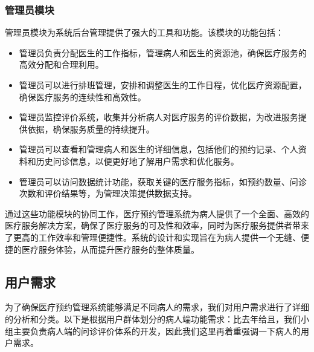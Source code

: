 \subsubsection{管理员模块}
管理员模块为系统后台管理提供了强大的工具和功能。该模块的功能包括：
\begin{itemize}
	\item 管理员负责分配医生的工作指标，管理病人和医生的资源池，确保医疗服务的高效分配和合理利用。
	\item 管理员可以进行排班管理，安排和调整医生的工作日程，优化医疗资源配置，确保医疗服务的连续性和高效性。
	\item 管理员监控评价系统，收集并分析病人对医疗服务的评价数据，为改进服务提供依据，确保服务质量的持续提升。
	\item 管理员可以查看和管理病人和医生的详细信息，包括他们的预约记录、个人资料和历史问诊信息，以便更好地了解用户需求和优化服务。
	\item 管理员可以访问数据统计功能，获取关键的医疗服务指标，如预约数量、问诊次数和评价结果等，为管理决策提供数据支持。
\end{itemize}

通过这些功能模块的协同工作，医疗预约管理系统为病人提供了一个全面、高效的医疗服务解决方案，确保了医疗服务的可及性和效率，同时为医疗服务提供者带来了更高的工作效率和管理便捷性。系统的设计和实现旨在为病人提供一个无缝、便捷的医疗服务体验，从而提升医疗服务的整体质量。



\subsection{用户需求}
为了确保医疗预约管理系统能够满足不同病人的需求，我们对用户需求进行了详细的分析和分类。以下是根据用户群体划分的病人端功能需求：比去年给且，我们小组主要负责病人端的问诊评价体系的开发，因此我们这里再着重强调一下病人的用户需求。

